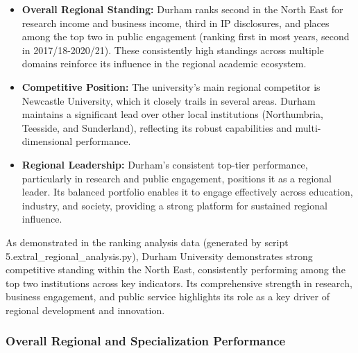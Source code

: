 \documentclass[journal,onecolumn, 10pt,draftclsnofoot]{IEEEtran}
\begin{document}
\begin{itemize}
    \item \textbf{Overall Regional Standing:} Durham ranks second in the North East for research income and business income, third in IP disclosures, and places among the top two in public engagement (ranking first in most years, second in 2017/18-2020/21). These consistently high standings across multiple domains reinforce its influence in the regional academic ecosystem.
    
    \item \textbf{Competitive Position:} The university's main regional competitor is Newcastle University, which it closely trails in several areas. Durham maintains a significant lead over other local institutions (Northumbria, Teesside, and Sunderland), reflecting its robust capabilities and multi-dimensional performance.
    
    \item \textbf{Regional Leadership:} Durham's consistent top-tier performance, particularly in research and public engagement, positions it as a regional leader. Its balanced portfolio enables it to engage effectively across education, industry, and society, providing a strong platform for sustained regional influence.
\end{itemize}

As demonstrated in the ranking analysis data (generated by script 5.extral\_regional\_analysis.py), Durham University demonstrates strong competitive standing within the North East, consistently performing among the top two institutions across key indicators. Its comprehensive strength in research, business engagement, and public service highlights its role as a key driver of regional development and innovation.

\subsubsection{Overall Regional and Specialization Performance}
\end{document}
